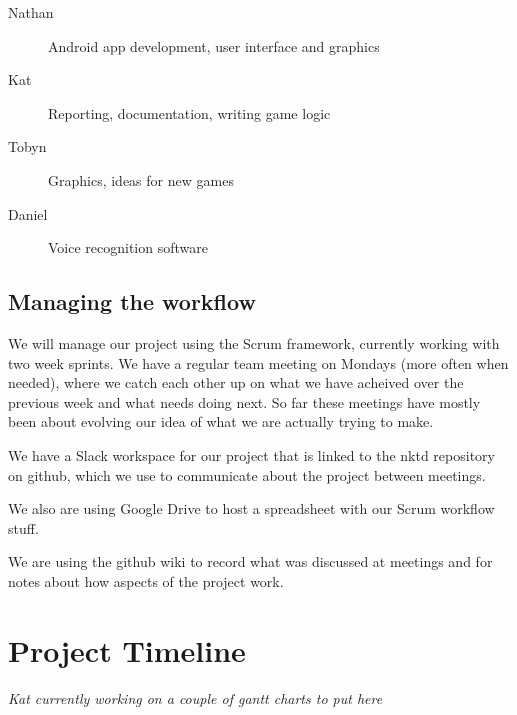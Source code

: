 \documentclass[11pt, oneside]{article}
\begin{document}
\begin{description}
\item [Nathan] Android app development, user interface and graphics
\item [Kat] Reporting, documentation, writing game logic
\item [Tobyn] Graphics, ideas for new games
\item [Daniel] Voice recognition software
\end{description}


\subsection*{Managing the workflow}

We will manage our project using the Scrum framework, currently
working with two week sprints. We have a regular team meeting on
Mondays (more often when needed), where we catch each other up on what
we have acheived over the previous week and what needs doing next. So
far these meetings have mostly been about evolving our idea of what we
are actually trying to make.

We have a Slack workspace for our project that is linked to the nktd
repository on github, which we use to communicate about the project
between meetings.

We also are using Google Drive to host a spreadsheet with our Scrum
workflow stuff.

We are using the github wiki to record what was discussed at meetings
and for notes about how aspects of the project work.


\section*{Project Timeline}

{\em Kat currently working on a couple of gantt charts to put here}


%
\end{document}

